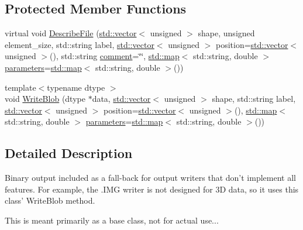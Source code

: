 \subsection*{Protected Member Functions}
\begin{DoxyCompactItemize}
\item 
virtual void \hyperlink{class_q_s_t_e_m_1_1_c_binary_output_a41c1e9aa3832eefcdffea0d33d29ef2c}{Describe\-File} (\hyperlink{qmb_8m_af54b69a32590de218622e869b06b47b3}{std\-::vector}$<$ unsigned $>$ shape, unsigned element\-\_\-size, std\-::string label, \hyperlink{qmb_8m_af54b69a32590de218622e869b06b47b3}{std\-::vector}$<$ unsigned $>$ position=\hyperlink{qmb_8m_af54b69a32590de218622e869b06b47b3}{std\-::vector}$<$ unsigned $>$(), std\-::string \hyperlink{image_sim_8m_aea4cc4bd8e43a7f8ebf9b0ee3da8d681}{comment}=\char`\"{}\char`\"{}, \hyperlink{_displacement_params_8m_af619c74fd72bdb64d115463dff2720cd}{std\-::map}$<$ std\-::string, double $>$ \hyperlink{sim_image_from_wave_8m_acb6d7970e73c00effe1d16e23142f11d}{parameters}=\hyperlink{_displacement_params_8m_af619c74fd72bdb64d115463dff2720cd}{std\-::map}$<$ std\-::string, double $>$())
\item 
{\footnotesize template$<$typename dtype $>$ }\\void \hyperlink{class_q_s_t_e_m_1_1_c_binary_output_adf3084deab8701c80d66ab536a32dd72}{Write\-Blob} (dtype $\ast$data, \hyperlink{qmb_8m_af54b69a32590de218622e869b06b47b3}{std\-::vector}$<$ unsigned $>$ shape, std\-::string label, \hyperlink{qmb_8m_af54b69a32590de218622e869b06b47b3}{std\-::vector}$<$ unsigned $>$ position=\hyperlink{qmb_8m_af54b69a32590de218622e869b06b47b3}{std\-::vector}$<$ unsigned $>$(), \hyperlink{_displacement_params_8m_af619c74fd72bdb64d115463dff2720cd}{std\-::map}$<$ std\-::string, double $>$ \hyperlink{sim_image_from_wave_8m_acb6d7970e73c00effe1d16e23142f11d}{parameters}=\hyperlink{_displacement_params_8m_af619c74fd72bdb64d115463dff2720cd}{std\-::map}$<$ std\-::string, double $>$())
\end{DoxyCompactItemize}


\subsection{Detailed Description}
Binary output included as a fall-\/back for output writers that don't implement all features. For example, the .I\-M\-G writer is not designed for 3\-D data, so it uses this class' Write\-Blob method.

This is meant primarily as a base class, not for actual use... 


